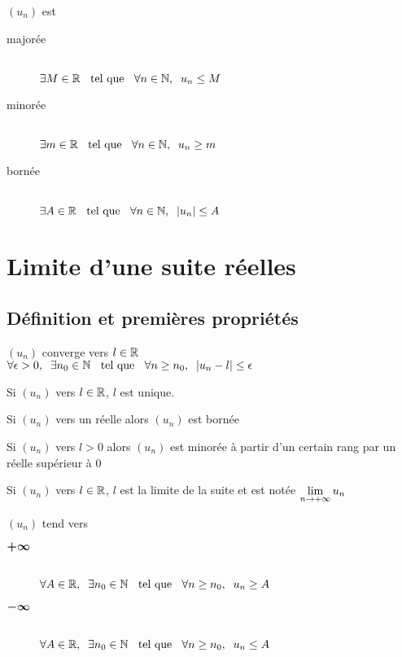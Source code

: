\begin{dfn}
$(u_n)$ est
\begin{description}
    \item[majorée] \quad \\
    \ssi $\exists M \in \mathbb{R} \;\;\text{ tel que }\;\; \forall n \in \mathbb{N}, \;\; u_n \leq M$
    \item[minorée] \quad \\
    \ssi $\exists m \in \mathbb{R} \;\;\text{ tel que }\;\; \forall n \in \mathbb{N}, \;\; u_n \geq m$
    \item[bornée] \quad \\
    \ssi $\exists A \in \mathbb{R} \;\;\text{ tel que }\;\; \forall n \in \mathbb{N}, \;\; |u_n| \leq A$
\end{description}
\end{dfn}


\section{Limite d'une suite réelles}

\subsection{Définition et premières propriétés}

\begin{dfn}
$(u_n)$ converge vers $l \in \mathbb{R}$ \ssi \\
$\forall \epsilon > 0, \;\; \exists n_0 \in \mathbb{N} \;\;\text{ tel que }\;\; \forall n \geq n_0, \;\;
|u_n - l| \leq \epsilon$
\end{dfn}

\begin{prp}
Si $(u_n)$ \cv vers $l \in \mathbb{R}$, $l$ est unique.
\end{prp}

\begin{prp}
Si $(u_n)$ \cv vers un réelle alors $(u_n)$ est bornée
\end{prp}

\begin{prp}
    Si $(u_n)$ \cv vers $l > 0$ alors $(u_n)$ est minorée à partir d'un
    certain rang par un réelle supérieur à $0$
\end{prp}

\begin{dfn}
    Si $(u_n)$ \cv vers $l \in \mathbb{R}$, $l$ est la limite de la suite et
    est notée $\lim\limits_{n \to +\infty} u_n$
\end{dfn}

\begin{dfn}
$(u_n)$ tend vers
\begin{description}
    \item[$\boldsymbol{+\infty}$] \quad \\
    \ssi $\forall A \in \mathbb{R}, \;\; \exists n_0 \in \mathbb{N} \;\;\text{ tel que }\;\; \forall n \geq n_0, \;\;
    u_n \geq A$
    \item[$\boldsymbol{-\infty}$] \quad \\
    \ssi $\forall A \in \mathbb{R}, \;\; \exists n_0 \in \mathbb{N} \;\;\text{ tel que }\;\; \forall n \geq n_0, \;\;
    u_n \leq A$
\end{description}
\end{dfn}


